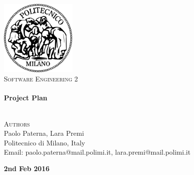 \begin{titlepage}
\begin{center}


~\\[1cm]
\includegraphics[width=0.28\textwidth]{./images/logo-polimi}~\\[1.5cm]

\textsc{\huge \textsc{Software Engineering 2}
}
\\[1cm]

\HRule \\[0.4cm]
{ \huge \bfseries Project Plan\\[0.3cm]
		}
\HRule \\[1.5cm]

\noindent
\begin{minipage}{1.0\textwidth}
\begin{center}


\textsc{\large{Authors}} \\
\large{
Paolo Paterna, Lara Premi \\
\vspace{0.8cm}
\small{
Politecnico di Milano, Italy\\
Email: paolo.paterna@mail.polimi.it, lara.premi@mail.polimi.it
}
}

\end{center}
\end{minipage}%

\vfill
\textbf{\large{2nd Feb 2016}}

\end{center}
\end{titlepage}
